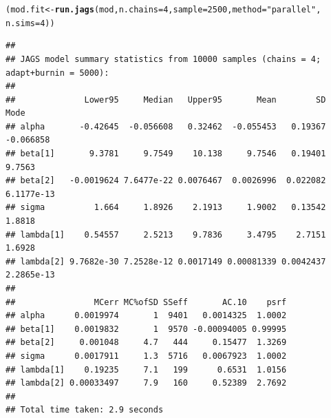 \documentclass{beamer}\usepackage[]{graphicx}\usepackage[]{color}
\makeatletter
\newcommand{\hlnum}[1]{\textcolor[rgb]{0.686,0.059,0.569}{#1}}%
\newcommand{\hlstr}[1]{\textcolor[rgb]{0.192,0.494,0.8}{#1}}%
\newcommand{\hlstd}[1]{\textcolor[rgb]{0.345,0.345,0.345}{#1}}%
\newcommand{\hlkwb}[1]{\textcolor[rgb]{0.69,0.353,0.396}{#1}}%
\newcommand{\hlkwc}[1]{\textcolor[rgb]{0.333,0.667,0.333}{#1}}%
\newcommand{\hlkwd}[1]{\textcolor[rgb]{0.737,0.353,0.396}{\textbf{#1}}}%
\newenvironment{kframe}{%
 \def\at@end@of@kframe{}%
 \ifinner\ifhmode%
  \def\at@end@of@kframe{\end{minipage}}%
  \begin{minipage}{\columnwidth}%
 \fi\fi%
 \def\FrameCommand##1{\hskip\@totalleftmargin \hskip-\fboxsep
 \colorbox{shadecolor}{##1}\hskip-\fboxsep
     \hskip-\linewidth \hskip-\@totalleftmargin \hskip\columnwidth}%
 \MakeFramed {\advance\hsize-\width
   \@totalleftmargin\z@ \linewidth\hsize
   \@setminipage}}%
 {\par\unskip\endMakeFramed%
 \at@end@of@kframe}
\newenvironment{knitrout}{}{} %
\makeatother
\begin{document}
\newsavebox{\ipriorjagsc}
\begin{lrbox}{\ipriorjagsc}
\begin{knitrout}\scriptsize
{}\color{fgcolor}\begin{kframe}
\begin{alltt}
\hlstd{(mod.fit} \hlkwb{<-} \hlkwd{run.jags}\hlstd{(mod,} \hlkwc{n.chains} \hlstd{=} \hlnum{4}\hlstd{,} \hlkwc{sample} \hlstd{=} \hlnum{2500}\hlstd{,} \hlkwc{method} \hlstd{=} \hlstr{"parallel"}\hlstd{,}
                     \hlkwc{n.sims} \hlstd{=} \hlnum{4}\hlstd{))}
\end{alltt}
\begin{verbatim}
## 
## JAGS model summary statistics from 10000 samples (chains = 4; adapt+burnin = 5000):
##                                                                          
##              Lower95     Median   Upper95       Mean        SD       Mode
## alpha       -0.42645  -0.056608   0.32462  -0.055453   0.19367  -0.066858
## beta[1]       9.3781     9.7549    10.138     9.7546   0.19401     9.7563
## beta[2]   -0.0019624 7.6477e-22 0.0076467  0.0026996  0.022082 6.1177e-13
## sigma          1.664     1.8926    2.1913     1.9002   0.13542     1.8818
## lambda[1]    0.54557     2.5213    9.7836     3.4795    2.7151     1.6928
## lambda[2] 9.7682e-30 7.2528e-12 0.0017149 0.00081339 0.0042437 2.2865e-13
##                                                       
##                MCerr MC%ofSD SSeff       AC.10    psrf
## alpha      0.0019974       1  9401   0.0014325  1.0002
## beta[1]    0.0019832       1  9570 -0.00094005 0.99995
## beta[2]     0.001048     4.7   444     0.15477  1.3269
## sigma      0.0017911     1.3  5716   0.0067923  1.0002
## lambda[1]    0.19235     7.1   199      0.6531  1.0156
## lambda[2] 0.00033497     7.9   160     0.52389  2.7692
## 
## Total time taken: 2.9 seconds
\end{verbatim}
\end{kframe}
\end{knitrout}
\end{lrbox}
\end{document}
